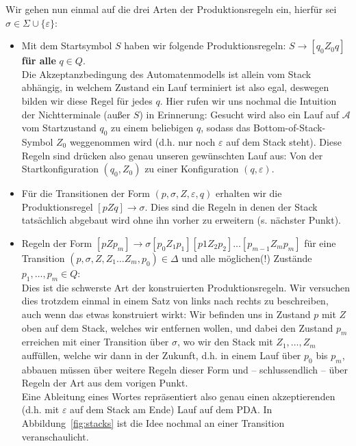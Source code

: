 \documentclass[11pt, a4paper]{article}
\theoremstyle{definition}
\theoremstyle{plain}
\begin{document}
Wir gehen nun einmal auf die drei Arten der Produktionsregeln ein, hierfür sei $\sigma \in \Sigma \cup \{ \varepsilon \}$:
\begin{itemize}
	\item Mit dem Startsymbol $S$ haben wir folgende Produktionsregeln: $S \to [q_0 Z_0 q]$ \textbf{für alle} $q \in Q$.\\
	Die Akzeptanzbedingung des Automatenmodells ist allein vom Stack abhängig, in welchem Zustand ein Lauf terminiert ist also egal, deswegen bilden wir diese Regel für jedes $q$. Hier rufen wir uns nochmal die Intuition der Nichtterminale (außer $S$) in Erinnerung: Gesucht wird also ein Lauf auf $\mathcal{A}$ vom Startzustand $q_0$ zu einem beliebigen $q$, sodass das Bottom-of-Stack-Symbol $Z_0$ weggenommen wird (d.h. nur noch $\varepsilon$ auf dem Stack steht). Diese Regeln sind drücken also genau unseren gewünschten Lauf aus: Von der Startkonfiguration $(q_0, Z_0)$ zu einer Konfiguration $(q, \varepsilon)$.
	\item Für die Transitionen der Form $(p, \sigma, Z, \varepsilon, q)$ erhalten wir die Produktionsregel $[pZq] \to \sigma$. Dies sind die Regeln in denen der Stack tatsächlich abgebaut wird ohne ihn vorher zu erweitern (s. nächster Punkt).
	\item Regeln der Form $[pZp_m] \to \sigma [p_0 Z_1 p_1][p1 Z_2 p_2] \ldots [p_{m-1} Z_m p_m]$ für eine Transition $(p, \sigma, Z, Z_1 \ldots Z_m, p_0) \in \Delta$ und alle möglichen(!) Zustände $p_1, \ldots, p_m \in Q$:\\
	Dies ist die schwerste Art der konstruierten Produktionsregeln. Wir versuchen dies trotzdem einmal in einem Satz von links nach rechts zu beschreiben, auch wenn das etwas konstruiert wirkt:
	Wir befinden uns in Zustand $p$ mit $Z$ oben auf dem Stack, welches wir entfernen wollen, und dabei den Zustand $p_m$ erreichen mit einer Transition über $\sigma$, wo wir den Stack mit $Z_1, \ldots, Z_m$ auffüllen, welche wir dann in der Zukunft, d.h. in einem Lauf über $p_0$ bis $p_m$, abbauen müssen über weitere Regeln dieser Form und -- schlussendlich -- über Regeln der Art aus dem vorigen Punkt.\\
	Eine Ableitung eines Wortes repräsentiert also genau einen akzeptierenden (d.h. mit $\varepsilon$ auf dem Stack am Ende) Lauf auf dem PDA. In Abbildung~\ref{fig:stacks} ist die Idee nochmal an einer Transition veranschaulicht.
\end{itemize}
\end{document}
